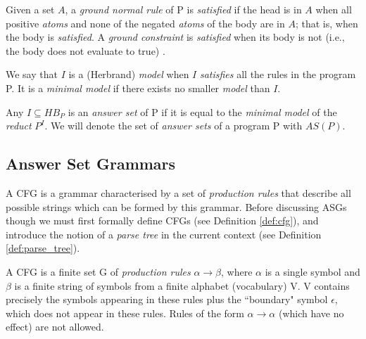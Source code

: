 \noindent
Given a set $A$, a \textit{ground normal rule} of P is \textit{satisfied} if the head is in $A$ when all positive \textit{atoms} and none of the negated \textit{atoms} of the body are in $A$; that is, when the body is \textit{satisfied}. A \textit{ground constraint} is \textit{satisfied} when its body is not (i.e., the body does not evaluate to true) \cite{law_representing_2019}.

\begin{definition}
We say that $I$ is a (Herbrand) \textit{model} when $I$ \textit{satisfies} all the rules in the program P. It is a \textit{minimal model} if there exists no smaller \textit{model} than $I$.
\end{definition}

\begin{definition}
\label{def:answer_set}
Any $I \subseteq HB_P$ is an \textit{answer set} of P if it is equal to the \textit{minimal model}  of the \textit{reduct} $P^I$. We will denote the set of \textit{answer sets} of a program P with $AS(P)$. 
\end{definition}

\subsection{Answer Set Grammars}

A CFG is a grammar characterised by a set of \textit{production rules} that describe all possible strings which can be formed by this grammar. Before discussing ASGs though we must first formally define CFGs (see Definition \ref{def:cfg}), and introduce the notion of a \textit{parse tree} in the current context (see Definition \ref{def:parse_tree}).

\begin{definition}
\label{def:cfg}
A CFG is a finite set G of \textit{production rules} $\alpha \to \beta$, where $\alpha$ is a single symbol and $\beta$ is a finite string of symbols from a finite alphabet (vocabulary) V. V contains precisely the symbols appearing in these rules plus the ``boundary" symbol $\epsilon$, which does not appear in these rules. Rules of the form $\alpha \to \alpha$ (which have no effect) are not allowed.
\end{definition}

